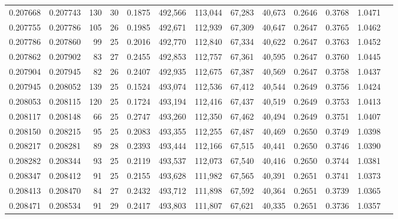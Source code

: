 \begin{tabular}{rrrrrrrrrrrrr}
0.207668 & 0.207743 & 130 &  30 &                                     0.1875 & 492,566 & 113,044 &  67,283 &  40,673 & 0.2646 & 0.3768 & 1.0471 \\
0.207755 & 0.207786 & 105 &  26 &                                     0.1985 & 492,671 & 112,939 &  67,309 &  40,647 & 0.2647 & 0.3765 & 1.0462 \\
0.207786 & 0.207860 &  99 &  25 &                                     0.2016 & 492,770 & 112,840 &  67,334 &  40,622 & 0.2647 & 0.3763 & 1.0452 \\
0.207862 & 0.207902 &  83 &  27 &                                     0.2455 & 492,853 & 112,757 &  67,361 &  40,595 & 0.2647 & 0.3760 & 1.0445 \\
0.207904 & 0.207945 &  82 &  26 &                                     0.2407 & 492,935 & 112,675 &  67,387 &  40,569 & 0.2647 & 0.3758 & 1.0437 \\
0.207945 & 0.208052 & 139 &  25 &                                     0.1524 & 493,074 & 112,536 &  67,412 &  40,544 & 0.2649 & 0.3756 & 1.0424 \\
0.208053 & 0.208115 & 120 &  25 &                                     0.1724 & 493,194 & 112,416 &  67,437 &  40,519 & 0.2649 & 0.3753 & 1.0413 \\
0.208117 & 0.208148 &  66 &  25 &                                     0.2747 & 493,260 & 112,350 &  67,462 &  40,494 & 0.2649 & 0.3751 & 1.0407 \\
0.208150 & 0.208215 &  95 &  25 &                                     0.2083 & 493,355 & 112,255 &  67,487 &  40,469 & 0.2650 & 0.3749 & 1.0398 \\
0.208217 & 0.208281 &  89 &  28 &                                     0.2393 & 493,444 & 112,166 &  67,515 &  40,441 & 0.2650 & 0.3746 & 1.0390 \\
0.208282 & 0.208344 &  93 &  25 &                                     0.2119 & 493,537 & 112,073 &  67,540 &  40,416 & 0.2650 & 0.3744 & 1.0381 \\
0.208347 & 0.208412 &  91 &  25 &                                     0.2155 & 493,628 & 111,982 &  67,565 &  40,391 & 0.2651 & 0.3741 & 1.0373 \\
0.208413 & 0.208470 &  84 &  27 &                                     0.2432 & 493,712 & 111,898 &  67,592 &  40,364 & 0.2651 & 0.3739 & 1.0365 \\
0.208471 & 0.208534 &  91 &  29 &                                     0.2417 & 493,803 & 111,807 &  67,621 &  40,335 & 0.2651 & 0.3736 & 1.0357 \\

\end{tabular}
